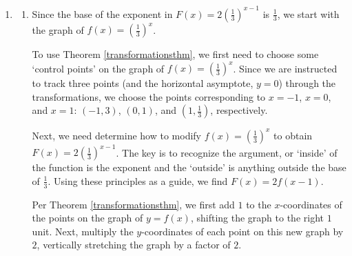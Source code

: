 \documentclass{ximera}
\begin{document}
\begin{example}
\begin{enumerate}
\begin{image}
\end{image}

\end{enumerate}

\begin{explanation}

\begin{enumerate}

\item 

\begin{enumerate}

\item  Since the base of the exponent in  $F(x) = 2 \left( \frac{1}{3} \right)^{x-1}$ is $\frac{1}{3}$, we start with the graph of  $f(x) = \left(\frac{1}{3}\right)^{x}$.  



To use Theorem  \ref{transformationsthm}, we first need to choose some `control points' on the graph of $f(x) = \left(\frac{1}{3}\right)^{x}$. Since we are instructed to track three points (and the horizontal asymptote, $y = 0$) through the transformations, we choose the points corresponding  to $x = -1$, $x = 0$, and $x = 1$:   $(-1, 3)$, $(0,1)$, and $\left( 1, \frac{1}{3} \right)$, respectively.   



Next, we need determine how to modify  $f(x) =  \left(\frac{1}{3}\right)^{x}$  to obtain $F(x) = 2 \left( \frac{1}{3} \right)^{x-1}$.  The key is to recognize the argument, or `inside' of the function is the exponent and the `outside' is anything outside the base of $\frac{1}{3}$.   Using these principles as a guide, we find  $F(x) = 2 f(x-1)$. \



Per Theorem  \ref{transformationsthm}, we first add $1$ to the $x$-coordinates of the points on the graph of $y = f(x)$, shifting the graph to the right $1$ unit.   Next, multiply the $y$-coordinates of each point on this new graph by $2$, vertically stretching the graph by a factor of $2$.  




\end{enumerate}
\end{enumerate}
\end{explanation}
\end{example}
\end{document}
